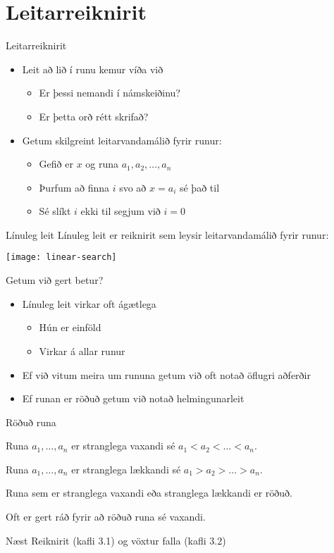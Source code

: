 \documentclass{beamer}
\begin{document}
\section{Leitarreiknirit}

\begin{frame}{Leitarreiknirit}
\begin{itemize}
 \item Leit að lið í runu kemur víða við
 \begin{itemize}
  \item Er þessi nemandi í námskeiðinu? 
  \item Er þetta orð rétt skrifað?
 \end{itemize}
 \item Getum skilgreint leitarvandamálið fyrir runur:
 \begin{itemize}
  \item Gefið er $x$ og runa $a_1, a_2, \ldots, a_n$
  \item Þurfum að finna $i$ svo að $x = a_i$ sé það til
  \item Sé slíkt $i$ ekki til segjum við $i = 0$
 \end{itemize}
\end{itemize}
\end{frame}

\begin{frame}{Línuleg leit}
Línuleg leit er reiknirit sem leysir leitarvandamálið fyrir runur:

\begin{center}
\texttt{[image: linear-search]}
\end{center}
\end{frame}

\begin{frame}{Getum við gert betur?}
\begin{itemize}
 \item Línuleg leit virkar oft ágætlega
 \begin{itemize}
  \item Hún er einföld
  \item Virkar á allar runur
 \end{itemize}
 \item Ef við vitum meira um rununa getum við oft notað öflugri aðferðir
 \item Ef runan er röðuð getum við notað helmingunarleit
\end{itemize}
\end{frame}

\begin{frame}{Röðuð runa}
\begin{tcolorbox}[title=Röðuð runa]
Runa $a_1, \ldots, a_n$ er stranglega vaxandi sé $a_1 < a_2 < \ldots < a_n$.

Runa $a_1, \ldots, a_n$ er stranglega lækkandi sé $a_1 > a_2 > \ldots > a_n$.

Runa sem er stranglega vaxandi eða stranglega lækkandi er röðuð.
\end{tcolorbox}

Oft er gert ráð fyrir að röðuð runa sé vaxandi.
\end{frame}



\begin{frame}{Næst}
Reiknirit (kafli 3.1) og vöxtur falla (kafli 3.2)
\end{frame}
\end{document}
